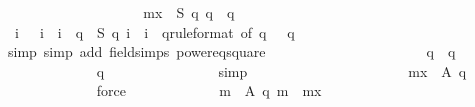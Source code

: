\begin{isabellebody}
\ \ \ \ \ \ \ \ \isamarkupfalse%
\isanewline
\ \ \ \ \ \ \ \ \ \ \isamarkupfalse%
\ {\isachardoublequoteopen}{\isacharquery}mx\ {\isacharequal}\ {\isacharparenleft}{\isacharquery}S\ {\isacharparenleft}q{\isacharplus}{}{\isacharparenright}\ q{\isacharparenright}\ {\isacharslash}\ q{\isachardoublequoteclose}\isanewline
\ \ \ \ \ \ \ \ \ \ \ \ \isamarkupfalse%
\ {\isacharbackquoteopen}{\isasymforall}\ i{\isachardot}\ {}\ {\isasymle}\ i\ {\isasymand}\ i\ {\isasymle}\ q\ {\isasymlongrightarrow}\ {\isacharquery}S\ {\isacharparenleft}q{\isacharplus}{}{\isacharparenright}\ i\ {\isacharequal}\ i\ {\isacharminus}\ {}{\isacharslash}q{\isacharbackquoteclose}{\isacharbrackleft}rule{\isacharunderscore}format{\isacharcomma}\ of\ q{\isacharbrackright}\ {\isacharbackquoteopen}{}\ {\isasymle}\ q{\isacharbackquoteclose}\isanewline
\ \ \ \ \ \ \ \ \ \ \ \ \isamarkupfalse%
\ simp\ {\isacharparenleft}simp\ add{\isacharcolon}\ field{\isacharunderscore}simps\ power{}{\isacharunderscore}eq{\isacharunderscore}square{\isacharparenright}\isanewline
\ \ \ \ \ \ \ \ \ \ \isamarkupfalse%
\isanewline
\ \ \ \ \ \ \ \ \ \ \isamarkupfalse%
\ {\isachardoublequoteopen}q\ {\isasymin}\ {\isacharbraceleft}{}{\isachardot}{\isachardot}{\isacharless}q\ {\isacharplus}\ {}\ {\isacharplus}\ {}{\isacharbraceright}{\isachardoublequoteclose}\isanewline
\ \ \ \ \ \ \ \ \ \ \ \ \isamarkupfalse%
\ {\isacharbackquoteopen}q\ {\isasymge}\ {}{\isacharbackquoteclose}\isanewline
\ \ \ \ \ \ \ \ \ \ \ \ \isamarkupfalse%
\ simp\isanewline
\ \ \ \ \ \ \ \ \ \ \isamarkupfalse%
\isanewline
\ \ \ \ \ \ \ \ \ \ \isamarkupfalse%
\ {\isachardoublequoteopen}{\isacharquery}mx\ {\isasymin}\ {\isacharquery}A\ {\isacharparenleft}q{\isacharplus}{}{\isacharparenright}{\isachardoublequoteclose}\isanewline
\ \ \ \ \ \ \ \ \ \ \ \ \isamarkupfalse%
\ force\isanewline
\isanewline
\ \ \ \ \ \ \ \ \ \ \isamarkupfalse%
\ {\isachardoublequoteopen}{\isasymforall}\ m{\isacharprime}\ {\isasymin}\ {\isacharquery}A\ {\isacharparenleft}q{\isacharplus}{}{\isacharparenright}{\isachardot}\ m{\isacharprime}\ {\isasymle}\ {\isacharquery}mx{\isachardoublequoteclose}\isanewline
\ \ \ \ \ \ \ \ \ \ \isamarkupfalse%
\ \isanewline
\ \ \ \ \ \ \ \ \ \ \ \ \isamarkupfalse%

\end{isabellebody}
